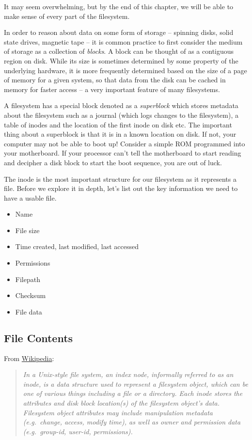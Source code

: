 It may seem overwhelming, but by the end of this chapter, we will be able to make sense of every part of the filesystem.

In order to reason about data on some form of storage -- spinning disks, solid state drives, magnetic tape -- it is common practice to first consider the medium of storage as a collection of \emph{blocks}.
A block can be thought of as a contiguous region on disk.
While its size is sometimes determined by some property of the underlying hardware, it is more frequently determined based on the size of a page of memory for a given system, so that data from the disk can be cached in memory for faster access -- a very important feature of many filesystems.

A filesystem has a special block denoted as a \emph{superblock} which stores metadata about the filesystem such as a journal (which logs changes to the filesystem), a table of inodes and the location of the first inode on disk etc.
The important thing about a superblock is that it is in a known location on disk.
If not, your computer may not be able to boot up!
Consider a simple ROM programmed into your motherboard.
If your processor can't tell the motherboard to start reading and decipher a disk block to start the boot sequence, you are out of luck.

The inode is the most important structure for our filesystem as it represents a file.
Before we explore it in depth, let's list out the key information we need to have a usable file.

\begin{itemize}
\tightlist
  \item Name
  \item File size
  \item Time created, last modified, last accessed
  \item Permissions
  \item Filepath
  \item Checksum
  \item File data
\end{itemize}

\subsection{File Contents}

From \href{http://en.wikipedia.org/wiki/Inode}{Wikipedia}:

\begin{quote}
  \emph{In a Unix-style file system, an index node, informally referred to as an inode, is a data structure used to represent a filesystem object, which can be one of various things including a file or a directory.
    Each inode stores the attributes and disk block location(s) of the filesystem object's data.
    Filesystem object attributes may include manipulation metadata (e.g.~change, access, modify time), as well as owner and permission data (e.g.~group-id, user-id, permissions).}
\end{quote}

